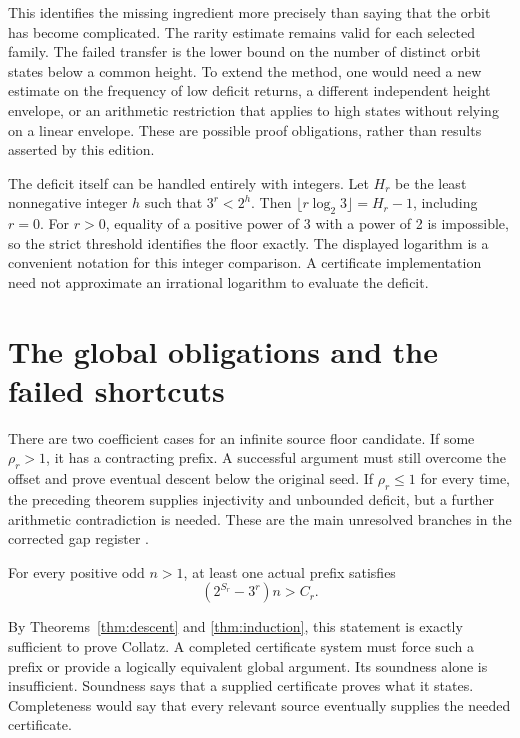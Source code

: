 This identifies the missing ingredient more precisely than saying that the orbit has become complicated. The rarity estimate remains valid for each selected family. The failed transfer is the lower bound on the number of distinct orbit states below a common height. To extend the method, one would need a new estimate on the frequency of low deficit returns, a different independent height envelope, or an arithmetic restriction that applies to high states without relying on a linear envelope. These are possible proof obligations, rather than results asserted by this edition.

The deficit itself can be handled entirely with integers. Let $H_r$ be the least nonnegative integer $h$ such that $3^r<2^h$. Then $\lfloor r\log_2 3\rfloor=H_r-1$, including $r=0$. For $r>0$, equality of a positive power of 3 with a power of 2 is impossible, so the strict threshold identifies the floor exactly. The displayed logarithm is a convenient notation for this integer comparison. A certificate implementation need not approximate an irrational logarithm to evaluate the deficit.

\section{The global obligations and the failed shortcuts}
There are two coefficient cases for an infinite source floor candidate. If some $\rho_r>1$, it has a contracting prefix. A successful argument must still overcome the offset and prove eventual descent below the original seed. If $\rho_r\le1$ for every time, the preceding theorem supplies injectivity and unbounded deficit, but a further arithmetic contradiction is needed. These are the main unresolved branches in the corrected gap register \cite{projectcollatzgap}.

\begin{conjecture}\label{conj:packetdescent}
For every positive odd $n>1$, at least one actual prefix satisfies
\[
\left(2^{S_r}-3^r\right)n>C_r.
\]
\end{conjecture}
By Theorems~\ref{thm:descent} and \ref{thm:induction}, this statement is exactly sufficient to prove Collatz. A completed certificate system must force such a prefix or provide a logically equivalent global argument. Its soundness alone is insufficient. Soundness says that a supplied certificate proves what it states. Completeness would say that every relevant source eventually supplies the needed certificate.

